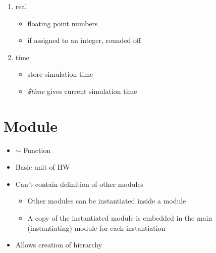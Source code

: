 \documentclass[11pt,twoside,a4paper,titlepage]{article}
\begin{document}
\begin{enumerate}
\begin{enumerate}
\begin{itemize}
                \end{itemize}
            \item real
                \begin{itemize}
                    \item floating point numbers
                    \item if assigned to an integer, rounded off
                \end{itemize}
            \item time
                \begin{itemize}
                    \item store simulation time
                    \item \emph{\$time} gives current simulation time 
                \end{itemize}
        \end{enumerate}
\end{enumerate}
\section{Module}
\begin{itemize}
    \item $\sim$ Function
    \item Basic unit of HW
    \item Can't contain definition of other modules
        \begin{itemize}
            \item Other modules can be instantiated inside a module
            \item A copy of the instantiated module is embedded in the main (instantiating) module for each instantiation
        \end{itemize}
    \item Allows creation of hierarchy
\end{itemize}
\end{document}
